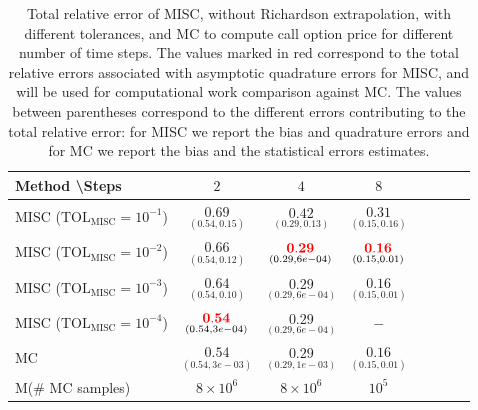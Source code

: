 \FloatBarrier

\begin{table}[h!]
	\centering
	\begin{tabular}{l*{6}{c}r}
		Method \textbackslash  Steps            & $2$ & $4$ & $8$   \\
		\hline

		MISC ($\text{TOL}_{\text{MISC}}=10^{-1}$)  & $\underset{(0.54,0.15)}{\mathbf{
			0.69}}$& $ \underset{(0.29,0.13)}{\mathbf{    
			0.42}}$ & $ \underset{(0.15,0.16)}{\mathbf{     
			0.31
		}}$   \\

		MISC ($\text{TOL}_{\text{MISC}}=10^{-2}$)  & $\underset{(0.54,0.12)}{\mathbf{ 
			0.66}}$ & $ \underset{(0.29,6e-04)}{\mathbf{  {\color{red} 
				0.29
			}
		}}$ & $\underset{(0.15,0.01)}{\mathbf{ {\color{red}    0.16}}}$   \\
		MISC ($\text{TOL}_{\text{MISC}}=10^{-3}$)        & $\underset{(0.54,0.10)}{\mathbf{
			0.64}}$  &  $ \underset{(0.29,6e-04)}{\mathbf{
			0.29
		}}$ &  $\underset{(0.15,0.01)}{\mathbf{    0.16}}$ \\
		MISC ($\text{TOL}_{\text{MISC}}=10^{-4}$)        & $\underset{(0.54,3e-04)}{\mathbf{       {\color{red}0.54}}}$  & $ \underset{(0.29,6e-04)}{\mathbf{
			0.29
		}}$  &  $-$ \\
		\hline
		MC    & $\underset{(0.54,3e-03)}{\mathbf{0.54}}$  & $\underset{(0.29,1e-03)}{\mathbf{0.29}}$  &$\underset{(0.15,0.01)}{
				\mathbf{0.16}}$  \\	
		M(\# MC samples)   & $8 \times 10^6$  & $8 \times 10^6$  &$10^5$  \\	
		\hline
	\end{tabular}
	\caption{Total relative error of MISC, without Richardson extrapolation, with different tolerances, and MC to compute call option price for different number of time steps. The values marked in red correspond to the total relative errors associated with  asymptotic quadrature errors for MISC, and will be used for computational work comparison against MC. The values between parentheses correspond to the different errors contributing to the total relative error: for MISC we report the bias and quadrature errors and for MC we report the bias and the statistical errors estimates.}
	\label{Total error of MISC and MC to compute Call option price of the different tolerances for different number of time steps. Case $K=1$, $H=0.07$, without Richardson extrapolation. The numbers between parentheses are the corresponding absolute errors,linear}
\end{table}
\FloatBarrier




